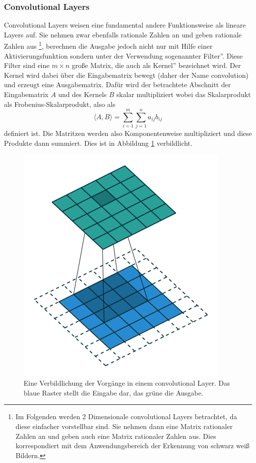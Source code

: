 \documentclass{article}
\begin{document}
\subsubsection{Convolutional Layers}
Convolutional Layers weisen eine fundamental andere Funktionsweise als lineare Layers auf. Sie nehmen zwar ebenfalls rationale Zahlen an und geben rationale Zahlen aus \footnote{Im Folgenden werden 2 Dimensionale convolutional Layers betrachtet, da diese einfacher vorstellbar sind. Sie nehmen dann eine Matrix rationaler Zahlen an und geben auch eine Matrix rationaler Zahlen aus. Dies korrespondiert mit dem Anwendungsbereich der Erkennung von schwarz weiß Bildern.}, berechnen die Ausgabe jedoch nicht nur mit Hilfe einer Aktivierungsfunktion sondern unter der Verwendung sogenannter \glqq Filter''. Diese Filter sind eine $m\times n$ große Matrix, die auch als \glqq Kernel'' bezeichnet wird. Der Kernel wird dabei über die Eingabematrix bewegt (daher der Name convolution) und erzeugt eine Ausgabematrix. Dafür wird der betrachtete Abschnitt der Eingabematrix $A$ und des Kernels $B$ skalar multipliziert wobei das Skalarprodukt als Frobenius-Skalarprodukt, also als
\begin{equation*}
	\langle A, B\rangle=\sum_{i=1}^{m}\sum_{j=1}^{n}a_{ij}b_{ij}
\end{equation*} 
definiert ist. Die Matritzen werden also Komponentenweise multipliziert und diese Produkte dann summiert.\newline
Dies ist in Abbildung \ref{Convolution_illustration} verbildlicht.
\begin{figure}[h]
	\begin{center}
	\includegraphics[width=0.2\linewidth]{../graphics/conv/conv008.png}
	\end{center}
	\caption[Eine Verbildlichung der Vorgänge in einem convolutional Layer\newline
	Aus einer Animation von\newline
	https://github.com/vdumoulin/conv\_arithmetic/blob/master/README.md\\
	Vincent Dumoulin, Francesco Visin - A guide to convolution arithmetic for deep learning (BibTeX)]{Eine Verbildlichung der Vorgänge in einem convolutional Layer. Das blaue Raster stellt die Eingabe dar, das grüne die Ausgabe.}
	\label{Convolution_illustration}
\end{figure}
\end{document}
